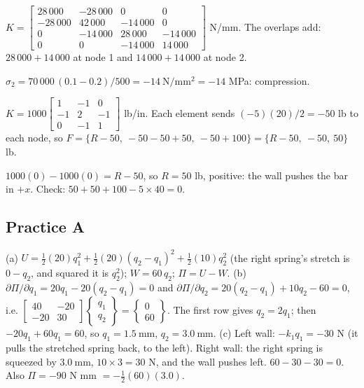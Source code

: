 \documentclass[11pt]{article}
\newcommand{\mm}{\ \mathrm{mm}}
\begin{document}
$K = \begin{bmatrix}28\,000&-28\,000&0&0\\-28\,000&42\,000&-14\,000&0\\0&-14\,000&28\,000&-14\,000\\0&0&-14\,000&14\,000\end{bmatrix}$ N/mm.
The overlaps add: $28\,000 + 14\,000$ at node 1 and $14\,000 + 14\,000$ at node 2.

$\sigma_2 = 70\,000\,(0.1 - 0.2)/500 = -14\ \mathrm{N/mm^2} = -14$ MPa: compression.

$K = 1000\begin{bmatrix}1&-1&0\\-1&2&-1\\0&-1&1\end{bmatrix}$ lb/in. Each element sends $(-5)(20)/2 = -50$ lb to each
node, so $F = \{R - 50,\ -50 - 50 + 50,\ -50 + 100\} = \{R - 50,\ -50,\ 50\}$ lb.

$1000(0) - 1000(0) = R - 50$, so $R = 50$ lb, positive: the wall pushes the bar in $+x$.
Check: $50 + 50 + 100 - 5\times40 = 0$.

\subsection*{Practice A}
(a) $U = \tfrac12(20)q_1^2 + \tfrac12(20)(q_2 - q_1)^2 + \tfrac12(10)q_2^2$ (the right spring's stretch is $0 - q_2$,
and squared it is $q_2^2$); $W = 60\,q_2$; $\Pi = U - W$.
(b) $\partial\Pi/\partial q_1 = 20q_1 - 20(q_2 - q_1) = 0$ and $\partial\Pi/\partial q_2 = 20(q_2 - q_1) + 10q_2 - 60 = 0$,
i.e. $\begin{bmatrix}40&-20\\-20&30\end{bmatrix}\begin{Bmatrix}q_1\\q_2\end{Bmatrix} = \begin{Bmatrix}0\\60\end{Bmatrix}$.
The first row gives $q_2 = 2q_1$; then $-20q_1 + 60q_1 = 60$, so $q_1 = 1.5\mm$, $q_2 = 3.0\mm$.
(c) Left wall: $-k_1 q_1 = -30$ N (it pulls the stretched spring back, to the left). Right wall: the right spring is
squeezed by $3.0\mm$, $10\times3 = 30$ N, and the wall pushes left. $60 - 30 - 30 = 0$. Also $\Pi = -90$ N mm
$= -\tfrac12(60)(3.0)$.
\end{document}
